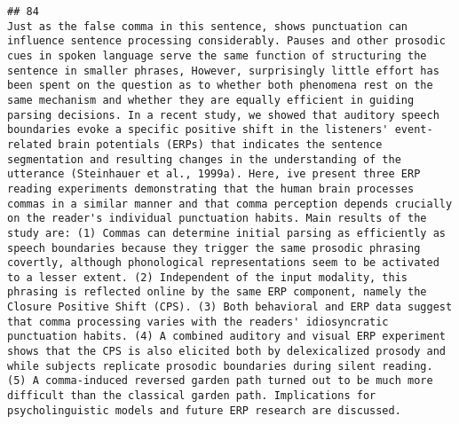\documentclass[
  english,
  man]{apa6}
\begin{document}
\begin{verbatim}
## 84                                                                                                                                                                                                                                                                                                                                                                                                                                                                                                                                                                                                                                                                                                                                                                                                      Just as the false comma in this sentence, shows punctuation can influence sentence processing considerably. Pauses and other prosodic cues in spoken language serve the same function of structuring the sentence in smaller phrases, However, surprisingly little effort has been spent on the question as to whether both phenomena rest on the same mechanism and whether they are equally efficient in guiding parsing decisions. In a recent study, we showed that auditory speech boundaries evoke a specific positive shift in the listeners' event-related brain potentials (ERPs) that indicates the sentence segmentation and resulting changes in the understanding of the utterance (Steinhauer et al., 1999a). Here, ive present three ERP reading experiments demonstrating that the human brain processes commas in a similar manner and that comma perception depends crucially on the reader's individual punctuation habits. Main results of the study are: (1) Commas can determine initial parsing as efficiently as speech boundaries because they trigger the same prosodic phrasing covertly, although phonological representations seem to be activated to a lesser extent. (2) Independent of the input modality, this phrasing is reflected online by the same ERP component, namely the Closure Positive Shift (CPS). (3) Both behavioral and ERP data suggest that comma processing varies with the readers' idiosyncratic punctuation habits. (4) A combined auditory and visual ERP experiment shows that the CPS is also elicited both by delexicalized prosody and while subjects replicate prosodic boundaries during silent reading. (5) A comma-induced reversed garden path turned out to be much more difficult than the classical garden path. Implications for psycholinguistic models and future ERP research are discussed.

\end{verbatim}
\end{document}
